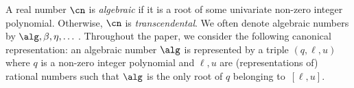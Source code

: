 




A real number $\cn$ is \emph{algebraic} if it is a root of some univariate
non-zero integer polynomial. Otherwise, $\cn$ is \emph{transcendental}. We often
denote algebraic numbers by $\alg,\beta,\eta,\dots$\,. Throughout the paper, we
consider the following canonical representation: an algebraic number $\alg$ is
represented by a triple $(q,\ell,u)$ where $q$ is a non-zero integer polynomial
and $\ell,u$ are (representations of) rational numbers such that $\alg$ is the
only root of $q$ belonging to~$[\ell,u]$. 

